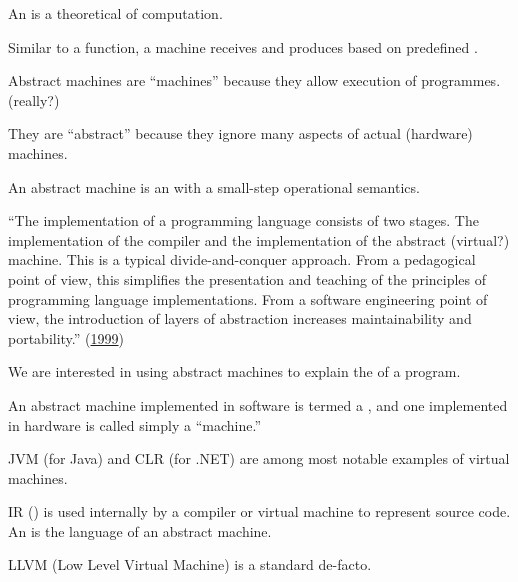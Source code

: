 \documentclass{article}
\begin{document}

\pptToc



An  is a theoretical  of computation.

Similar to a function, a machine receives  and produces  based on predefined .

Abstract machines are ``machines'' because they allow  execution of programmes. (really?)

They are ``abstract'' because they ignore many aspects of actual (hardware) machines.

An abstract machine is an  with a small-step operational semantics.

\plush{}


``The implementation of a programming language consists of two
stages. The implementation of the compiler and the implementation of the abstract (virtual?) machine.
This is a typical divide-and-conquer approach.
From a pedagogical point of view, this simplifies the presentation and
teaching of the principles of programming language implementations.
From a software engineering point of view, the introduction of layers of
abstraction increases maintainability and portability.'' (\href{https://www.sciencedirect.com/science/article/abs/pii/S0167739X99000886}{1999})

We are interested in using abstract machines to explain the  of a program.

\plush{}


An abstract machine implemented in software is termed a ,
and one implemented in hardware is called simply a ``machine.''

JVM (for Java) and CLR (for .NET) are among most notable examples of virtual machines.

IR () is used internally by a compiler or virtual machine to represent source code.
An  is the language of an abstract machine.

\plush{}


LLVM (Low Level Virtual Machine) is a standard de-facto.
\end{document}
